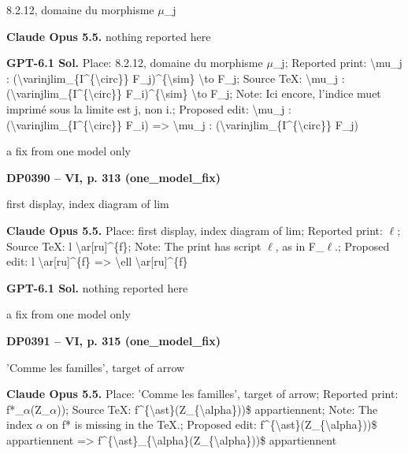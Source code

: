 8.2.12, domaine du morphisme \ensuremath{\mu}\_j\par
\textbf{Claude Opus 5.5.} nothing reported here\par
\textbf{GPT-6.1 Sol.} Place: 8.2.12, domaine du morphisme \ensuremath{\mu}\_j; Reported print: \textbackslash{}mu\_j : (\textbackslash{}varinjlim\_\{I\textasciicircum{}\{\textbackslash{}circ\}\} F\_j)\textasciicircum{}\{\textbackslash{}sim\} \textbackslash{}to F\_j; Source TeX: \textbackslash{}mu\_j : (\textbackslash{}varinjlim\_\{I\textasciicircum{}\{\textbackslash{}circ\}\} F\_i)\textasciicircum{}\{\textbackslash{}sim\} \textbackslash{}to F\_j; Note: Ici encore, l'indice muet imprimé sous la limite est j, non i.; Proposed edit: \textbackslash{}mu\_j : (\textbackslash{}varinjlim\_\{I\textasciicircum{}\{\textbackslash{}circ\}\} F\_i) =\allowbreak > \textbackslash{}mu\_j : (\textbackslash{}varinjlim\_\{I\textasciicircum{}\{\textbackslash{}circ\}\} F\_j)\par
a fix from one model only\par
\par\noindent\hypertarget{DP0390}{}\textbf{DP0390 -- VI, p. 313 (one\_model\_fix)}\par
first display, index diagram of lim\par
\textbf{Claude Opus 5.5.} Place: first display, index diagram of lim; Reported print: \ensuremath{\ell}; Source TeX: l \textbackslash{}ar[ru]\textasciicircum{}\{f\}; Note: The print has script \ensuremath{\ell}, as in F\_\ensuremath{\ell}.; Proposed edit: l \textbackslash{}ar[ru]\textasciicircum{}\{f\} =\allowbreak > \textbackslash{}ell \textbackslash{}ar[ru]\textasciicircum{}\{f\}\par
\textbf{GPT-6.1 Sol.} nothing reported here\par
a fix from one model only\par
\par\noindent\hypertarget{DP0391}{}\textbf{DP0391 -- VI, p. 315 (one\_model\_fix)}\par
'Comme les familles', target of arrow\par
\textbf{Claude Opus 5.5.} Place: 'Comme les familles', target of arrow; Reported print: f*\_\ensuremath{\alpha}(Z\_\ensuremath{\alpha})); Source TeX: f\textasciicircum{}\{\textbackslash{}ast\}(Z\_\{\textbackslash{}alpha\}))\$ appartiennent; Note: The index \ensuremath{\alpha} on f* is missing in the TeX.; Proposed edit: f\textasciicircum{}\{\textbackslash{}ast\}(Z\_\{\textbackslash{}alpha\}))\$ appartiennent =\allowbreak > f\textasciicircum{}\{\textbackslash{}ast\}\_\{\textbackslash{}alpha\}(Z\_\{\textbackslash{}alpha\}))\$ appartiennent\par
